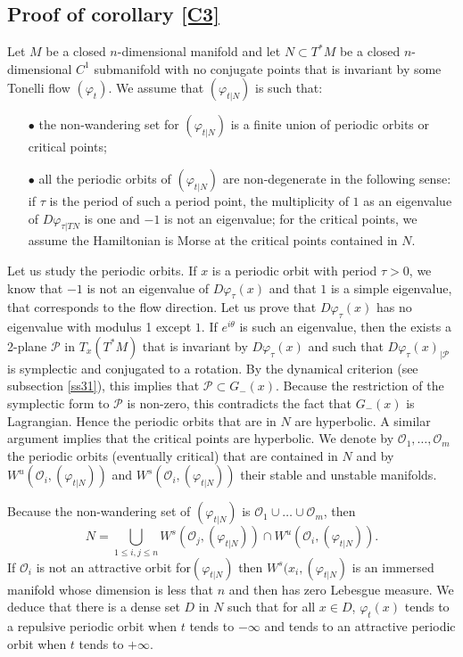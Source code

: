\documentclass{dcds}
\theoremstyle{definition}
\begin{document}
\subsection{Proof of corollary  \ref{C3}}

 Let $M$ be a closed $n$-dimensional manifold and let $N\subset T^*M$ be a closed $n$-dimensional $C^1$ submanifold with no conjugate points  that is invariant by some Tonelli flow $(\varphi_t)$. We assume that $(\varphi_{t|N})$ is such that:
   \begin{enumerate}
   \item[$\bullet$] the   non-wandering set for $(\varphi_{t|N})$ is a finite union of periodic orbits or critical points;
   \item[$\bullet$] all the periodic orbits of $(\varphi_{t|N})$ are non-degenerate in the following sense: if $\tau$ is the period of such a period point, the multiplicity of $1$  as an eigenvalue   of $D\varphi_{\tau|TN}$ is   one and $-1$ is not an eigenvalue; for the critical points, we assume the Hamiltonian is Morse at the critical points contained in $N$.
\end{enumerate}

  Let us study the periodic orbits. If $x$ is a periodic orbit with period $\tau>0$,  we know that $-1$ is not an eigenvalue of $D\varphi_\tau (x)$ and that $1$ is a simple eigenvalue, that corresponds to the flow direction. Let us prove that $D\varphi_\tau(x)$ has no eigenvalue with modulus 1 except $1$. If $e^{i\theta}$ is such an eigenvalue, then the exists a 2-plane ${\mathcal {P}}$ in $T_x(T^*M)$  that is invariant by $D\varphi_\tau(x)$ and such that $D\varphi_\tau(x)_{|{\mathcal {P}}}$ is symplectic and conjugated to a rotation. By the dynamical criterion (see subsection \ref{ss31}), this implies that ${\mathcal {P}}\subset G_-(x)$. Because the restriction of the symplectic form to ${\mathcal {P}}$ is non-zero,  this contradicts the fact that $G_-(x)$ is Lagrangian. Hence the periodic orbits that are in $N$ are hyperbolic. A similar argument implies that the critical points are hyperbolic. We denote by ${\mathcal {O}}_1, \dots , {\mathcal {O}}_m$ the periodic orbits (eventually critical) that are contained in $N$ and by $W^u({\mathcal {O}}_i, (\varphi_{t|N}))$ and $W^s({\mathcal {O}}_i, (\varphi_{t|N}))$ their stable and unstable manifolds.

  Because the non-wandering  set of $(\varphi_{t|N})$ is ${\mathcal {O}}_1\cup\dots \cup{\mathcal {O}}_m$, then $$\displaystyle{N=\bigcup_{1\leq i, j\leq n} W^s ({\mathcal {O}}_j,(\varphi_{t|N}))\cap W^u({\mathcal {O}}_i,(\varphi_{t|N}))}.$$
  If ${\mathcal {O}}_i$ is not an attractive orbit for$(\varphi_{t|N})$ then $W^s(x_i,(\varphi_{t|N})$ is an immersed manifold whose dimension is less that $n$ and then has zero Lebesgue measure. We deduce that there is a dense set $D$ in $N$ such that for all $x\in D$, $\varphi_t(x)$ tends to a repulsive periodic orbit when $t$ tends to $-\infty$ and tends to an attractive periodic orbit when $t$ tends to $+\infty$.
\end{document}
